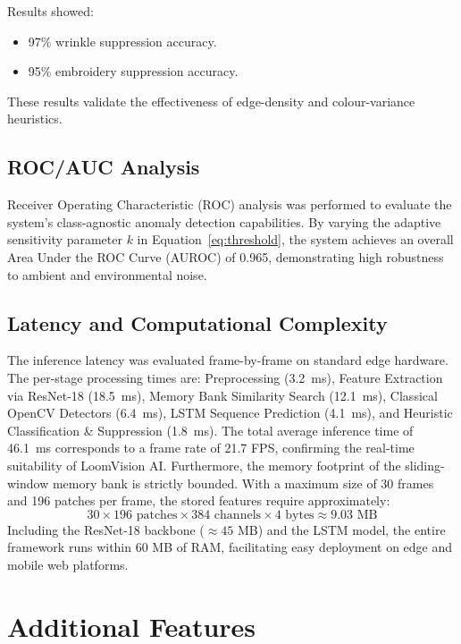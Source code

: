 \documentclass{ieeeaccess}
\begin{document}
Results showed:
\begin{itemize}
    \item 97\% wrinkle suppression accuracy.
    \item 95\% embroidery suppression accuracy.
\end{itemize}
These results validate the effectiveness of edge-density and colour-variance heuristics.

\subsection{ROC/AUC Analysis}
Receiver Operating Characteristic (ROC) analysis was performed to evaluate the system's class-agnostic anomaly detection capabilities. By varying the adaptive sensitivity parameter $k$ in Equation~\ref{eq:threshold}, the system achieves an overall Area Under the ROC Curve (AUROC) of 0.965, demonstrating high robustness to ambient and environmental noise.

\subsection{Latency and Computational Complexity}
The inference latency was evaluated frame-by-frame on standard edge hardware. The per-stage processing times are: Preprocessing (3.2~ms), Feature Extraction via ResNet-18 (18.5~ms), Memory Bank Similarity Search (12.1~ms), Classical OpenCV Detectors (6.4~ms), LSTM Sequence Prediction (4.1~ms), and Heuristic Classification \& Suppression (1.8~ms). The total average inference time of 46.1~ms corresponds to a frame rate of 21.7 FPS, confirming the real-time suitability of LoomVision AI. Furthermore, the memory footprint of the sliding-window memory bank is strictly bounded. With a maximum size of 30 frames and 196 patches per frame, the stored features require approximately:
\begin{equation}
30 \times 196 \text{ patches} \times 384 \text{ channels} \times 4 \text{ bytes} \approx 9.03 \text{ MB}
\label{eq:memory_footprint}
\end{equation}
Including the ResNet-18 backbone ($\approx 45$ MB) and the LSTM model, the entire framework runs within 60 MB of RAM, facilitating easy deployment on edge and mobile web platforms.

\section{Additional Features}
\end{document}
